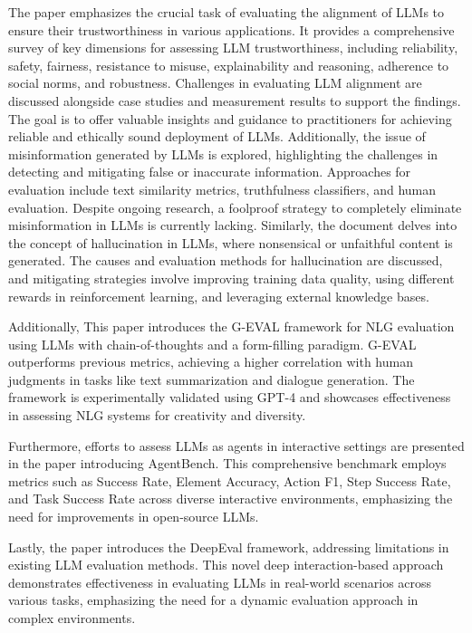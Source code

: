 The paper \cite{liu2023trustworthy} emphasizes the crucial task of evaluating the alignment of LLMs to ensure their trustworthiness in various applications. It provides a comprehensive survey of key dimensions for assessing LLM trustworthiness, including reliability, safety, fairness, resistance to misuse, explainability and reasoning, adherence to social norms, and robustness. Challenges in evaluating LLM alignment are discussed alongside case studies and measurement results to support the findings. The goal is to offer valuable insights and guidance to practitioners for achieving reliable and ethically sound deployment of LLMs. Additionally, the issue of misinformation generated by LLMs is explored, highlighting the challenges in detecting and mitigating false or inaccurate information. Approaches for evaluation include text similarity metrics, truthfulness classifiers, and human evaluation. Despite ongoing research, a foolproof strategy to completely eliminate misinformation in LLMs is currently lacking. Similarly, the document delves into the concept of hallucination in LLMs, where nonsensical or unfaithful content is generated. The causes and evaluation methods for hallucination are discussed, and mitigating strategies involve improving training data quality, using different rewards in reinforcement learning, and leveraging external knowledge bases.

Additionally, This paper \cite{liu2023geval} introduces the G-EVAL framework for NLG evaluation using LLMs with chain-of-thoughts and a form-filling paradigm. G-EVAL outperforms previous metrics, achieving a higher correlation with human judgments in tasks like text summarization and dialogue generation. The framework is experimentally validated using GPT-4 and showcases effectiveness in assessing NLG systems for creativity and diversity.

Furthermore, efforts to assess LLMs as agents in interactive settings are presented in the paper \cite{liu2023agentbench} introducing AgentBench. This comprehensive benchmark employs metrics such as Success Rate, Element Accuracy, Action F1, Step Success Rate, and Task Success Rate across diverse interactive environments, emphasizing the need for improvements in open-source LLMs.

Lastly, the paper \cite{li2023static} introduces the DeepEval framework, addressing limitations in existing LLM evaluation methods. This novel deep interaction-based approach demonstrates effectiveness in evaluating LLMs in real-world scenarios across various tasks, emphasizing the need for a dynamic evaluation approach in complex environments.

